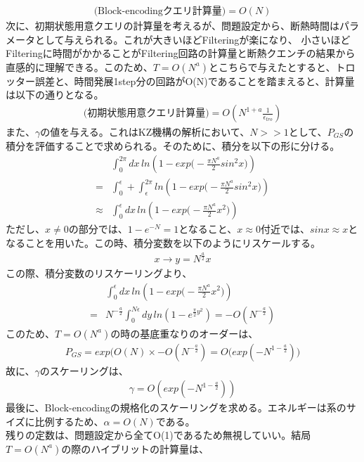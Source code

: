 \documentclass[a4paper,10.5pt]{article}
\numberwithin{equation}{section}
\begin{document}
\begin{enumerate}
\begin{align*}
    \text{(Block-encodingクエリ計算量)}=O(N)
\end{align*}
次に、初期状態用意クエリの計算量を考えるが、問題設定から、断熱時間はパラメータとして与えられる。これが大きいほどFilteringが楽になり、
小さいほどFilteringに時間がかかることがFiltering回路の計算量と断熱クエンチの結果から直感的に理解できる。このため、$T=O(N^{a})$とこちらで与えたとすると、トロッター誤差と、時間発展1step分の回路がO(N)であることを踏まえると、計算量は以下の通りとなる。
\begin{align*}
    \text{(初期状態用意クエリ計算量)}=O(N^{1+a}\frac{1}{\epsilon_{tro}})
\end{align*}
また、$\gamma$の値を与える。これはKZ機構の解析において、$N>>1$として、$P_{GS}$の積分を評価することで求められる。そのために、積分を以下の形に分ける。
\begin{align*}
    &\int_{0}^{2\pi}dx \,ln(1-exp\big(-\frac{\pi N^{a}}{2}  sin^{2}x\big))\\
    =&\int_{0}^{\epsilon} +\int_{\epsilon}^{2\pi}ln(1-exp\big(-\frac{\pi N^{a}}{2}sin^{2}x\big))\\
    \approx &\int_{0}^{\epsilon}dx\,ln(1-exp\big(-\frac{\pi N^{a}}{2}x^{2}\big))
\end{align*}
ただし、$x\neq0$の部分では、$1-e^{-N}=1$となること、$x\approx 0$付近では、$sinx\approx x$となることを用いた。この時、積分変数を以下のようにリスケールする。
\begin{align*}
    x \to y=N^{\frac{a}{2}}x
\end{align*}
この際、積分変数のリスケーリングより、
\begin{align*}
    &\int_{0}^{\epsilon}dx\,ln(1-exp\big(-\frac{\pi N^{a}}{2}x^{2}\big))\\
    =&N^{-\frac{a}{2}}\int_{0}^{N\epsilon}dy\,ln(1-e^{\frac{\pi}{2}y^{2}})
    =-O(N^{-\frac{a}{2}})
\end{align*}
このため、$T=O(N^{a})$の時の基底重なりのオーダーは、
\begin{align*}
    P_{GS}=exp(O(N)\times -O(N^{-\frac{a}{2}})=O\big(exp(-N^{1-\frac{a}{2}})\big)
\end{align*}
故に、$\gamma$のスケーリングは、
\begin{align*}
    \gamma =O(exp(-N^{1-\frac{a}{2}}))
\end{align*}
最後に、Block-encodingの規格化のスケーリングを求める。エネルギーは系のサイズに比例するため、$\alpha=O(N)$である。\\
残りの定数は、問題設定から全てO(1)であるため無視していい。結局$T=O(N^{a})$の際のハイブリットの計算量は、

\end{enumerate}
\end{document}
